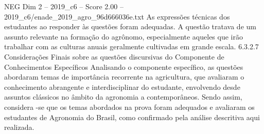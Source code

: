 \begin{textsample}{NEG Dim 2 – 2019\_c6 – Score 2.00 – 2019\_c6/enade\_2019\_agro\_96d666036e.txt}
As expressões técnicas dos estudantes ao responder às questões foram adequadas.
A questão tratava de um assunto relevante na formação do agrônomo, especialmente aqueles que irão trabalhar com as culturas anuais geralmente cultivadas em grande escala. 6.3.2.7 Considerações Finais sobre as questões discursivas do Componente de Conhecimentos Específicos Analisando o componente específico, as questões abordaram temas de importância recorrente na agricultura, que avaliaram o conhecimento abrangente e interdisciplinar do estudante, envolvendo desde assuntos clássicos no âmbito da agronomia a contemporâneos.
Sendo assim, considera -se que os temas abordados na prova foram adequados e avaliaram os estudantes de Agronomia do Brasil, como confirmado pela análise descritiva aqui realizada.

\end{textsample}
